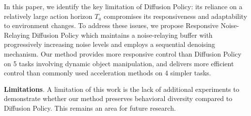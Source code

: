 In this paper, we identify the key limitation of Diffusion Policy: its reliance on a relatively large action horizon $T_a$ compromises its responsiveness and adaptability to environment changes. To address these issues, we propose Responsive Noise-Relaying Diffusion Policy which maintains a noise-relaying buffer with progressively increasing noise levels and employs a sequential denoising mechanism. Our method provides more responsive control than Diffusion Policy on 5 tasks involving dynamic object manipulation, and delivers more efficient control than commonly used acceleration methods on 4 simpler tasks.

\textbf{Limitations}. A limitation of this work is the lack of additional experiments to demonstrate whether our method preserves behavioral diversity compared to Diffusion Policy. This remains an area for future research.
